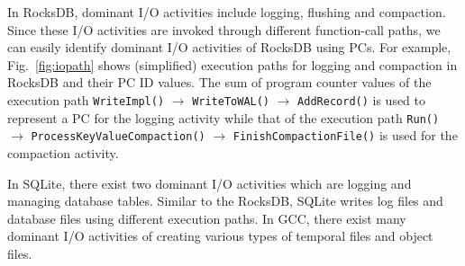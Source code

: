 In RocksDB, dominant I/O activities include logging, flushing and compaction.
Since these I/O activities are invoked through different 
function-call paths, we can easily
identify dominant I/O activities of RocksDB using PCs.  
For example, Fig.~\ref{fig:iopath} shows 
(simplified) execution paths for 
logging and compaction in RocksDB and their PC ID values.  
The sum of program counter values of the execution path
\texttt{WriteImpl()} $\rightarrow$ \texttt{WriteToWAL()} $\rightarrow$ \texttt{AddRecord()} is used
to represent a PC for the logging activity while that of the execution path
\texttt{Run()} $\rightarrow$
\texttt{ProcessKeyValueCompaction()} $\rightarrow$ \texttt{FinishCompactionFile()} is used
for the compaction activity.

In SQLite, there exist two dominant I/O activities which are logging and managing 
database tables.
Similar to the RocksDB, SQLite writes log files and database files using different
execution paths.
In GCC, there exist many dominant I/O activities of creating various types of 
temporal files and object files.


